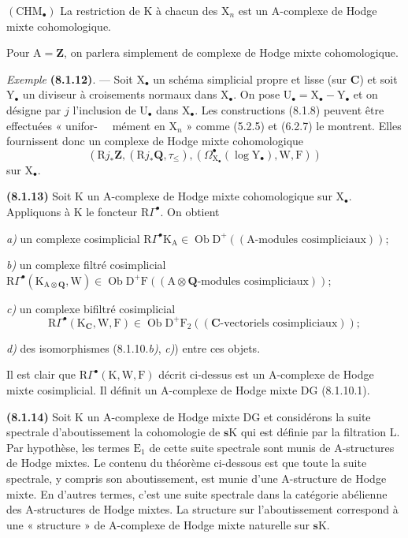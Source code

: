 \documentclass[11pt,leqno]{article}
\newcommand{\Page}[1]{\ifvmode\noindent\else\unskip\ \fi{\footnotesize\textcolor{gray}{[p.\,#1]}}\ \ignorespaces}
\begin{document}
\((\mathrm{CHM}_{\bullet})\) La restriction de \(\mathrm{K}\) à chacun des \(\mathrm{X}_{n}\) est un \(\mathrm{A}\)-complexe de Hodge mixte cohomologique.

Pour \(\mathrm{A}=\mathbf{Z}\), on parlera simplement de complexe de Hodge mixte cohomologique.

\textit{Exemple} \textbf{(8.1.12)}. — Soit \(\mathrm{X}_{\bullet}\) un schéma simplicial propre et lisse (sur \(\mathbf{C}\)) et soit \(\mathrm{Y}_{\bullet}\) un diviseur à croisements normaux dans \(\mathrm{X}_{\bullet}\). On pose \(\mathrm{U}_{\bullet}=\mathrm{X}_{\bullet}-\mathrm{Y}_{\bullet}\) et on désigne par \(j\) l’inclusion de \(\mathrm{U}_{\bullet}\) dans \(\mathrm{X}_{\bullet}\). Les constructions (8.1.8) peuvent être effectuées « unifor-%
\Page{32}mément en \(\mathrm{X}_{n}\) » comme (5.2.5) et (6.2.7) le montrent. Elles fournissent donc un complexe de Hodge mixte cohomologique
\[
(\mathrm{R}j_{\ast}\mathbf{Z},(\mathrm{R}j_{\ast}\mathbf{Q},\tau_{\leq}),
(\Omega_{\mathrm{X}_{\bullet}}^\bullet(\log\mathrm{Y}_{\bullet}),\mathrm{W},\mathrm{F}))
\]
sur \(\mathrm{X}_{\bullet}\).

\textbf{(8.1.13)} Soit \(\mathrm{K}\) un \(\mathrm{A}\)-complexe de Hodge mixte cohomologique sur \(\mathrm{X}_{\bullet}\). Appliquons à \(\mathrm{K}\) le foncteur \(\mathrm{R}\Gamma^\bullet\). On obtient

\textit{a)} un complexe cosimplicial \(\mathrm{R}\Gamma^\bullet\mathrm{K}_{\mathrm{A}}\in\operatorname{Ob}\mathrm{D}^{+}((\mathrm{A}\text{-modules cosimpliciaux}))\);

\textit{b)} un complexe filtré cosimplicial \(\mathrm{R}\Gamma^\bullet(\mathrm{K}_{\mathrm{A}\otimes\mathbf{Q}},\mathrm{W})\in\operatorname{Ob}\mathrm{D}^{+}\mathrm{F}((\mathrm{A}\otimes\mathbf{Q}\text{-modules cosimpliciaux}))\);

\textit{c)} un complexe bifiltré cosimplicial
\[
\mathrm{R}\Gamma^\bullet(\mathrm{K}_{\mathbf{C}},\mathrm{W},\mathrm{F})
\in\operatorname{Ob}\mathrm{D}^{+}\mathrm{F}_{2}((\mathbf{C}\text{-vectoriels cosimpliciaux}));
\]

\textit{d)} des isomorphismes (8.1.10.\textit{b)}, \textit{c)}) entre ces objets.

Il est clair que \(\mathrm{R}\Gamma^\bullet(\mathrm{K},\mathrm{W},\mathrm{F})\) décrit ci-dessus est un \(\mathrm{A}\)-complexe de Hodge mixte cosimplicial. Il définit un \(\mathrm{A}\)-complexe de Hodge mixte \(\mathrm{DG}\) (8.1.10.1).

\textbf{(8.1.14)} Soit \(\mathrm{K}\) un \(\mathrm{A}\)-complexe de Hodge mixte \(\mathrm{DG}\) et considérons la suite spectrale d’aboutissement la cohomologie de \(\mathbf{s}\mathrm{K}\) qui est définie par la filtration \(\mathrm{L}\). Par hypothèse, les termes \(\mathrm{E}_{1}\) de cette suite spectrale sont munis de \(\mathrm{A}\)-structures de Hodge mixtes. Le contenu du théorème ci-dessous est que toute la suite spectrale, y compris son aboutissement, est munie d’une \(\mathrm{A}\)-structure de Hodge mixte. En d’autres termes, c’est une suite spectrale dans la catégorie abélienne des \(\mathrm{A}\)-structures de Hodge mixtes. La structure sur l’aboutissement correspond à une « structure » de \(\mathrm{A}\)-complexe de Hodge mixte naturelle sur \(\mathbf{s}\mathrm{K}\).
\end{document}
